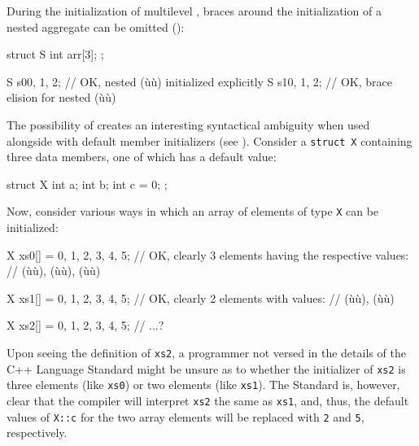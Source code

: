 During the initialization of multilevel , braces
around the initialization of a nested aggregate can be omitted
():

\begin{emcppslisting}[language=C++]
struct S
{
    int arr[3];
};

S s0{{0, 1, 2}};  // OK, nested (ù{}ù) initialized explicitly
S s1{0, 1, 2};    // OK, brace elision for nested (ù{}ù)
\end{emcppslisting}

\noindent The possibility of  creates an interesting
syntactical ambiguity when used alongside  with
default member initializers (see ). Consider a
\lstinline!struct!~\lstinline!X! containing three data members, one of which
has a default value:

\begin{emcppslisting}[language=C++]
struct X
{
    int a;
    int b;
    int c = 0;
};
\end{emcppslisting}

\noindent Now, consider various ways in which an array of elements of type
\lstinline!X! can be initialized:

\begin{emcppslisting}[language=C++]
X xs0[] = {{0, 1}, {2, 3}, {4, 5}};
    // OK, clearly 3 elements having the respective values:
    // (ù{}ù), (ù{}ù), (ù{}ù)

X xs1[] = {{0, 1, 2}, {3, 4, 5}};
    // OK, clearly 2 elements with values:
    // (ù{}ù), (ù{}ù)

X xs2[] = {0, 1, 2, 3, 4, 5};
    // ...?
\end{emcppslisting}

\noindent Upon seeing the definition of \lstinline!xs2!, a programmer not versed in
the details of the C++ Language Standard might be unsure as to whether the
initializer of \lstinline!xs2! is three elements (like \lstinline!xs0!) or two
elements (like \lstinline!xs1!). The Standard is, however, clear that the
compiler will interpret \lstinline!xs2! the same as \lstinline!xs1!, and,
thus, the default values of \lstinline!X::c! for the two array elements
will be replaced with \lstinline!2! and \lstinline!5!, respectively.


